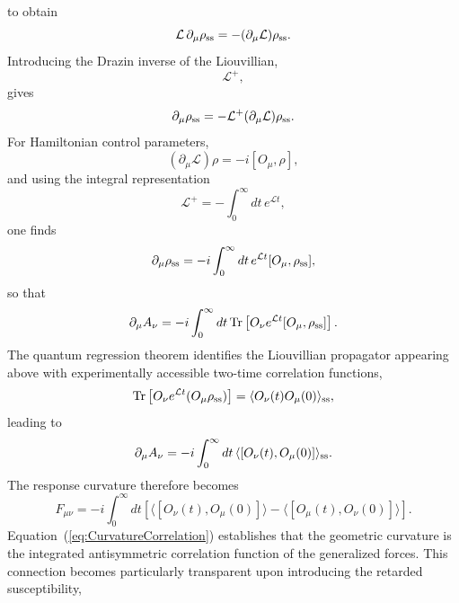 %
to obtain
%
\begin{equation}
\mathcal L
\,
\partial_\mu\rho_{\rm ss}
=
-
(\partial_\mu\mathcal L)
\rho_{\rm ss}.
\end{equation}
%
Introducing the Drazin inverse of the Liouvillian,
%
\begin{equation}
\mathcal L^+,
\end{equation}
%
gives
%
\begin{equation}
\partial_\mu\rho_{\rm ss}
=
-
\mathcal L^+
(\partial_\mu\mathcal L)
\rho_{\rm ss}.
\end{equation}
For Hamiltonian control parameters,
%
\begin{equation}
(\partial_\mu\mathcal L)\rho
=
-i
[O_\mu,\rho],
\end{equation}
%
and using the integral representation
%
\begin{equation}
\mathcal L^+
=
-
\int_0^\infty
dt\,
e^{\mathcal Lt},
\end{equation}
%
one finds
%
\begin{equation}
\partial_\mu\rho_{\rm ss}
=
-i
\int_0^\infty
dt\,
e^{\mathcal Lt}
[O_\mu,\rho_{\rm ss}],
\end{equation}
%
so that
%
\begin{equation}
\partial_\mu A_\nu
=
-i
\int_0^\infty
dt\,
\mathrm{Tr}
\left[
O_\nu
e^{\mathcal Lt}
[O_\mu,\rho_{\rm ss}]
\right].
\end{equation}
The quantum regression theorem identifies the Liouvillian
propagator appearing above with experimentally accessible
two-time correlation functions,
%
\begin{equation}
\mathrm{Tr}
\left[
O_\nu
e^{\mathcal Lt}
(O_\mu\rho_{\rm ss})
\right]
=
\langle
O_\nu(t)
O_\mu(0)
\rangle_{\rm ss},
\end{equation}
%
leading to
%
\begin{equation}
\partial_\mu A_\nu
=
-i
\int_0^\infty
dt\,
\langle
[O_\nu(t),O_\mu(0)]
\rangle_{\rm ss}.
\end{equation}
%
The response curvature therefore becomes
%
\begin{equation}
\boxed{
F_{\mu\nu}
=
-i
\int_0^\infty
dt
\left[
\langle
[O_\nu(t),O_\mu(0)]
\rangle
-
\langle
[O_\mu(t),O_\nu(0)]
\rangle
\right].
}
\label{eq:CurvatureCorrelation}
\end{equation}
Equation~(\ref{eq:CurvatureCorrelation}) establishes that the
geometric curvature is the integrated antisymmetric correlation
function of the generalized forces.
This connection becomes particularly transparent upon introducing
the retarded susceptibility,
